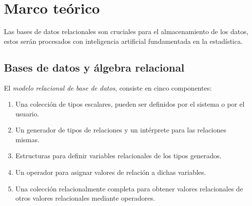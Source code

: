 \section {Marco teórico}\label{sec:marco}
Las bases de datos relacionales son cruciales para el almacenamiento de los datos, estos serán procesados con inteligencia artificial fundamentada en la estadística.
\subsection {Bases de datos y álgebra relacional}\label{subsec:rdb}
El \emph{modelo relacional de base de datos}, consiste en cinco componentes:
\begin{enumerate}
	\item Una colección de tipos escalares, pueden ser definidos por el sistema o por el usuario.
	\item Un generador de tipos de relaciones y un intérprete para las relaciones mismas.
	\item Estructuras para definir variables relacionales de los tipos generados.
	\item Un operador para asignar valores de relación a dichas variables.
	\item Una colección relacionalmente completa para obtener valores relacionales de otros valores relacionales mediante operadores.
\end{enumerate}
